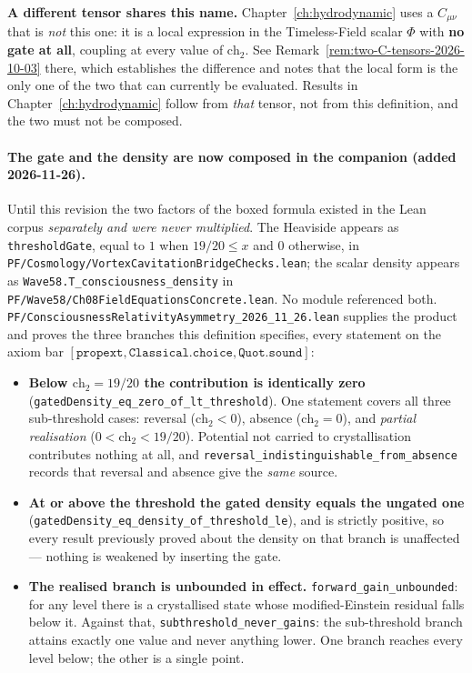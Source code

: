 \noindent\textbf{A different tensor shares this name.}
Chapter~\ref{ch:hydrodynamic} uses a $C_{\mu\nu}$ that is \emph{not} this one:
it is a local expression in the Timeless-Field scalar $\Phi$ with \textbf{no
gate at all}, coupling at every value of $\text{ch}_2$. See
Remark~\ref{rem:two-C-tensors-2026-10-03} there, which establishes the
difference and notes that the local form is the only one of the two that can
currently be evaluated. Results in Chapter~\ref{ch:hydrodynamic} follow from
\emph{that} tensor, not from this definition, and the two must not be
composed.
\paragraph{The gate and the density are now composed in the companion
(added 2026-11-26).}
Until this revision the two factors of the boxed formula existed in the Lean
corpus \emph{separately and were never multiplied}. The Heaviside appears as
\texttt{thresholdGate}, equal to $1$ when $19/20 \leq x$ and $0$ otherwise, in
\texttt{PF/Cosmology/VortexCavitationBridgeChecks.lean}; the scalar density
appears as \texttt{Wave58.T\_consciousness\_density} in
\texttt{PF/Wave58/Ch08FieldEquationsConcrete.lean}. No module referenced both.
\texttt{PF/ConsciousnessRelativityAsymmetry\_2026\_11\_26.lean} supplies the
product and proves the three branches this definition specifies, every
statement on the axiom bar $[\mathtt{propext}, \mathtt{Classical.choice},
\mathtt{Quot.sound}]$:

\begin{itemize}
\item \textbf{Below $\text{ch}_2 = 19/20$ the contribution is identically
  zero} (\texttt{gatedDensity\_eq\_zero\_of\_lt\_threshold}). One statement
  covers all three sub-threshold cases: reversal ($\text{ch}_2 < 0$), absence
  ($\text{ch}_2 = 0$), and \emph{partial realisation}
  ($0 < \text{ch}_2 < 19/20$). Potential not carried to crystallisation
  contributes nothing at all, and
  \texttt{reversal\_indistinguishable\_from\_absence} records that reversal and
  absence give the \emph{same} source.
\item \textbf{At or above the threshold the gated density equals the ungated
  one} (\texttt{gatedDensity\_eq\_density\_of\_threshold\_le}), and is strictly
  positive, so every result previously proved about the density on that branch
  is unaffected --- nothing is weakened by inserting the gate.
\item \textbf{The realised branch is unbounded in effect.}
  \texttt{forward\_gain\_unbounded}: for any level there is a crystallised state
  whose modified-Einstein residual falls below it. Against that,
  \texttt{subthreshold\_never\_gains}: the sub-threshold branch attains exactly
  one value and never anything lower. One branch reaches every level below; the
  other is a single point.
\end{itemize}

